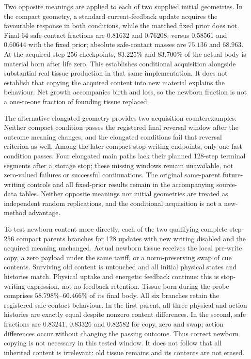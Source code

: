 Two opposite meanings are applied to each of two supplied initial geometries. In the compact geometry, a standard current-feedback update acquires the favourable response in both conditions, while the matched fixed prior does not. Final-64 safe-contact fractions are $0.81632$ and $0.76208$, versus $0.58561$ and $0.60644$ with the fixed prior; absolute safe-contact masses are $75.136$ and $68.963$. At the acquired step-256 checkpoints, $83.225\%$ and $83.700\%$ of the actual body is material born after life zero. This establishes conditional acquisition alongside substantial real tissue production in that same implementation. It does not establish that copying the acquired content into new material explains the behaviour. Net growth accompanies birth and loss, so the newborn fraction is not a one-to-one fraction of founding tissue replaced.

The alternative elongated geometry provides two acquisition counterexamples. Neither compact condition passes the registered final reversal window after the outcome meaning changes, and the elongated conditions fail that reversal criterion as well. Among the later compact stop-writing endpoints, only one fast condition passes. Four elongated main paths lack their planned 128-step terminal segments after a storage stop; these missing windows remain unavailable, not zero-valued failures or successful continuations. The original same-parent future-writing controls and all fixed-prior results remain in the accompanying source-data tables. Neither opposite meanings nor initial geometries are treated as independent random replications, and the conditional acquisition is not a new-method advantage.

To test newborn content more directly, each of the two qualifying complete step-256 compact parents branches for 128 updates with new writing disabled and the acquired meaning unchanged. Actual newborn tissue receives the local pre-write copy, a zero payload under the same tariff, or a norm-preserving swap of cue contents. Surviving old content is untouched and all initial physical states and histories match. Physical uptake and energetic feedback continue: this is stop-writing expression, not no-feedback retention. Tissue born during the probe comprises $58.798\%$--$60.466\%$ of its final body. All six branches retain the registered safe-contact behaviour. In the first parent, all three physical and action histories are exactly equal despite nonzero content differences. In the second, safe fractions are $0.83241$, $0.83326$ and $0.82582$ for copy, zero and swap; action differences occur without changing the passing outcome. Thus correct newborn copying is not necessary in this tested window. It does not follow that all inherited content is irrelevant: old tissue remains and its contents are not erased.

